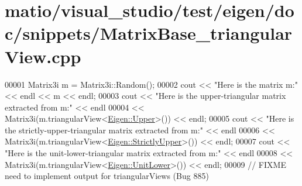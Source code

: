 \hypertarget{matio_2visual__studio_2test_2eigen_2doc_2snippets_2_matrix_base__triangular_view_8cpp_source}{}\section{matio/visual\+\_\+studio/test/eigen/doc/snippets/\+Matrix\+Base\+\_\+triangular\+View.cpp}
\label{matio_2visual__studio_2test_2eigen_2doc_2snippets_2_matrix_base__triangular_view_8cpp_source}

\begin{DoxyCode}
00001 Matrix3i m = Matrix3i::Random();
00002 cout << \textcolor{stringliteral}{"Here is the matrix m:"} << endl << m << endl;
00003 cout << \textcolor{stringliteral}{"Here is the upper-triangular matrix extracted from m:"} << endl
00004      << Matrix3i(m.triangularView<\hyperlink{group__enums_gga39e3366ff5554d731e7dc8bb642f83cda6bcb58be3b8b8ec84859ce0c5ac0aaec}{Eigen::Upper}>()) << endl;
00005 cout << \textcolor{stringliteral}{"Here is the strictly-upper-triangular matrix extracted from m:"} << endl
00006      << Matrix3i(m.triangularView<\hyperlink{group__enums_gga39e3366ff5554d731e7dc8bb642f83cdae38aad7d66fecfb213fce453edff4c7a}{Eigen::StrictlyUpper}>()) << endl;
00007 cout << \textcolor{stringliteral}{"Here is the unit-lower-triangular matrix extracted from m:"} << endl
00008      << Matrix3i(m.triangularView<\hyperlink{group__enums_gga39e3366ff5554d731e7dc8bb642f83cda8155cfdfde9e75e7144dff0393d17181}{Eigen::UnitLower}>()) << endl;
00009 \textcolor{comment}{// FIXME need to implement output for triangularViews (Bug 885)}
\end{DoxyCode}
